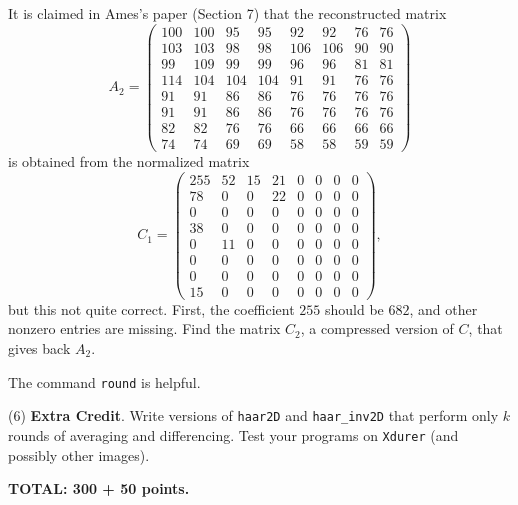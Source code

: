 \documentclass[12pt]{article}
\begin{document}
\medskip
It is claimed in Ames's paper (Section 7) that the reconstructed  matrix
\[
A_2 =
\begin{pmatrix}
100  &  100  &   95  &   95  &   92  &   92  &   76  &   76 \\
   103 &   103  &   98  &   98  &  106  &  106  &   90  &   90 \\
    99  &  109  &   99  &   99  &   96  &   96  &   81  &   81 \\
   114  &  104  &  104  &  104  &   91  &   91  &   76  &   76 \\
    91  &   91  &   86  &   86  &   76  &   76  &   76  &   76 \\
    91  &   91  &   86  &   86  &   76  &   76  &   76  &   76 \\
    82  &   82  &   76  &   76  &   66  &   66  &   66  &   66 \\
    74  &   74  &   69  &   69  &   58  &   58  &   59  &  59
\end{pmatrix}
\]
is obtained from the normalized matrix
\[
C_1 =
\begin{pmatrix}
255  &  52  &   15  &  21  &  0  &  0  &  0  &  0 \\
78   &    0   &    0   &  22  &  0  &  0  &  0  &  0 \\
0     &    0   &    0   &    0  &  0  &  0  &  0  &  0 \\
38     &    0   &    0   &    0  &  0  &  0  &  0  &  0 \\
0     &   11  &    0   &    0  &  0  &  0  &  0  &  0 \\
0     &    0   &    0   &    0  &  0  &  0  &  0  &  0 \\
0     &    0   &    0   &    0  &  0  &  0  &  0  &  0 \\
15     &    0   &    0   &    0  &  0  &  0  &  0  &  0 
\end{pmatrix},
\]
but this not quite correct. First, the coefficient $255$ should be
$682$, and other nonzero entries are missing.
Find the matrix $C_2$, a compressed version of $C$, that gives back
$A_2$.

\medskip
\hint
The command {\tt round} is helpful.

\medskip
(6)
{\bf Extra Credit}.
Write versions of  {\tt haar2D} and {\tt haar\_inv2D} that perform
only $k$ rounds of averaging and differencing.
Test your programs on {\tt Xdurer} (and possibly other images).


\vspace{0.5cm}\noindent
{\bf TOTAL: 300 + 50 points.}
\end{document}
